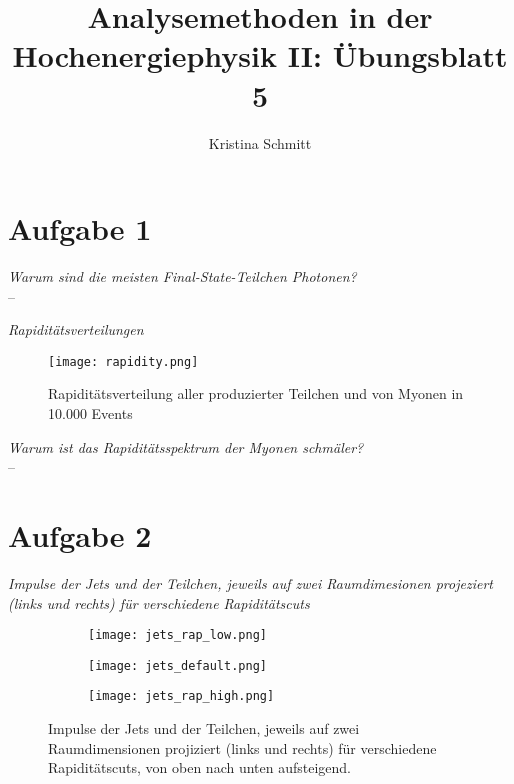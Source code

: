 \documentclass[]{scrartcl}
\title{Analysemethoden in der Hochenergiephysik II: Übungsblatt 5}
\author{Kristina Schmitt}
\begin{document}
	
	
	\maketitle
	
	\section*{Aufgabe 1}
	
	\textit{Warum sind die meisten Final-State-Teilchen Photonen?}\\
	--
	
	
	\textit{Rapiditätsverteilungen}\\
	
	\begin{figure}[h]
		\centering
		\texttt{[image: rapidity.png]}
		\caption[]{Rapiditätsverteilung aller produzierter Teilchen und von Myonen in 10.000 Events}
		\label{fig:rap}
	\end{figure}

	\textit{Warum ist das Rapiditätsspektrum der Myonen schmäler?}\\
	--

	\newpage
	
	\section*{Aufgabe 2}
	
	\textit{Impulse der Jets und der Teilchen, jeweils auf zwei Raumdimesionen projeziert (links und rechts) für verschiedene Rapiditätscuts}\\
	
	\begin{figure*}[h]
		\centering
		\begin{subfigure}[b]{0.7\textwidth}
			\centering
			\texttt{[image: jets\_rap\_low.png]} 
			
		\end{subfigure}
		\hfill
		\begin{subfigure}[b]{0.7\textwidth}  
			\centering 
			\texttt{[image: jets\_default.png]}
			
		\end{subfigure}
		\begin{subfigure}[b]{0.7\textwidth}  
			\centering 
			\texttt{[image: jets\_rap\_high.png]}
			
		\end{subfigure}
		\caption{Impulse der Jets und der Teilchen, jeweils auf zwei Raumdimensionen projiziert (links und rechts) für verschiedene Rapiditätscuts, von oben nach unten aufsteigend.}
		\label{fig:momenta}
	\end{figure*}
\end{document}
